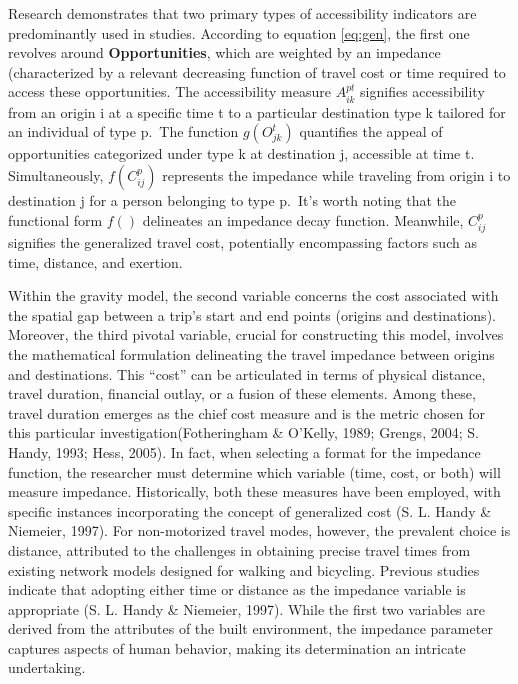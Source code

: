 \documentclass[
11pt, %
oneside, %
english, %
singlespacing, %
]{macthesis} %
\begin{document}
Research demonstrates that two primary types of accessibility indicators are predominantly used in studies. According to equation \eqref{eq:gen}, the first one revolves around \textbf{Opportunities}, which are weighted by an impedance (characterized by a relevant decreasing function of travel cost or time required to access these opportunities. The accessibility measure \(A^ {pt}_{ik}\) signifies accessibility from an origin i at a specific time t to a particular destination type k tailored for an individual of type p.~The function \(g(O^t_{jk})\) quantifies the appeal of opportunities categorized under type k at destination j, accessible at time t. Simultaneously, \(f(C^p_{ij})\) represents the impedance while traveling from origin i to destination j for a person belonging to type p.~It's worth noting that the functional form \(f()\) delineates an impedance decay function. Meanwhile, \(C^p_{ij}\) signifies the generalized travel cost, potentially encompassing factors such as time, distance, and exertion.

Within the gravity model, the second variable concerns the cost associated with the spatial gap between a trip's start and end points (origins and destinations). Moreover, the third pivotal variable, crucial for constructing this model, involves the mathematical formulation delineating the travel impedance between origins and destinations. This ``cost'' can be articulated in terms of physical distance, travel duration, financial outlay, or a fusion of these elements. Among these, travel duration emerges as the chief cost measure and is the metric chosen for this particular investigation(Fotheringham \& O'Kelly, 1989; Grengs, 2004; S. Handy, 1993; Hess, 2005). In fact, when selecting a format for the impedance function, the researcher must determine which variable (time, cost, or both) will measure impedance. Historically, both these measures have been employed, with specific instances incorporating the concept of generalized cost (S. L. Handy \& Niemeier, 1997). For non-motorized travel modes, however, the prevalent choice is distance, attributed to the challenges in obtaining precise travel times from existing network models designed for walking and bicycling. Previous studies indicate that adopting either time or distance as the impedance variable is appropriate (S. L. Handy \& Niemeier, 1997). While the first two variables are derived from the attributes of the built environment, the impedance parameter captures aspects of human behavior, making its determination an intricate undertaking.
\end{document}
